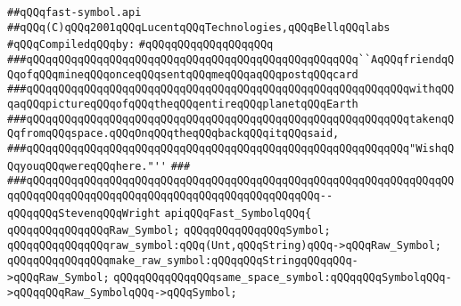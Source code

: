 \label{src/lib/compiler/front/basics/map/fast-symbol.api}
\verb|##qQQqfast-symbol.api|\newline
\verb|##qQQq(C)qQQq2001qQQqLucentqQQqTechnologies,qQQqBellqQQqlabs|\newline
\newline
\verb|#qQQqCompiledqQQqby:|\newline
\verb|#qQQqqQQqqQQqqQQqqQQq|\newline
\newline
\newline
\newline
\verb|###qQQqqQQqqQQqqQQqqQQqqQQqqQQqqQQqqQQqqQQqqQQqqQQqqQQq``AqQQqfriendqQQqofqQQqmineqQQqonceqQQqsentqQQqmeqQQqaqQQqpostqQQqcard|\newline
\verb|###qQQqqQQqqQQqqQQqqQQqqQQqqQQqqQQqqQQqqQQqqQQqqQQqqQQqqQQqqQQqwithqQQqaqQQqpictureqQQqofqQQqtheqQQqentireqQQqplanetqQQqEarth|\newline
\verb|###qQQqqQQqqQQqqQQqqQQqqQQqqQQqqQQqqQQqqQQqqQQqqQQqqQQqqQQqqQQqtakenqQQqfromqQQqspace.qQQqOnqQQqtheqQQqbackqQQqitqQQqsaid,|\newline
\verb|###qQQqqQQqqQQqqQQqqQQqqQQqqQQqqQQqqQQqqQQqqQQqqQQqqQQqqQQqqQQq"WishqQQqyouqQQqwereqQQqhere."''|\newline
\verb|###|\newline
\verb|###qQQqqQQqqQQqqQQqqQQqqQQqqQQqqQQqqQQqqQQqqQQqqQQqqQQqqQQqqQQqqQQqqQQqqQQqqQQqqQQqqQQqqQQqqQQqqQQqqQQqqQQqqQQqqQQqqQQq--qQQqqQQqStevenqQQqWright|\newline
\newline
\newline
\newline
\verb|apiqQQqFast_SymbolqQQq{|\newline
\newline
\verb|qQQqqQQqqQQqqQQqRaw_Symbol;|\newline
\verb|qQQqqQQqqQQqqQQqSymbol;|\newline
\newline
\verb|qQQqqQQqqQQqqQQqraw_symbol:qQQq(Unt,qQQqString)qQQq->qQQqRaw_Symbol;|\newline
\verb|qQQqqQQqqQQqqQQqmake_raw_symbol:qQQqqQQqStringqQQqqQQq->qQQqRaw_Symbol;|\newline
\newline
\verb|qQQqqQQqqQQqqQQqsame_space_symbol:qQQqqQQqSymbolqQQq->qQQqqQQqRaw_SymbolqQQq->qQQqSymbol;|\newline
\newline
